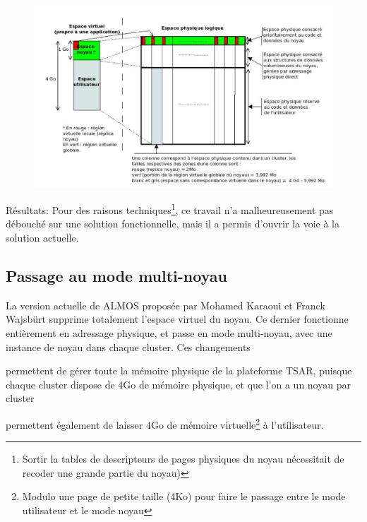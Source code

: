       \begin{figure}[!h]
        \centering \includegraphics[scale=0.17]{include/img/almos-guerret}
        \caption{}
        \label{almos-guerret}
      \end{figure}
      
      \begin{paragraph}{Résultats:}
        Pour des raisons techniques\footnote{Sortir la tables de descripteurs de
          pages physiques du noyau nécessitait de recoder une grande partie du
          noyau)}, ce travail n'a malheureusement pas débouché sur une solution
        fonctionnelle, mais il a permis d'ouvrir la voie à la solution actuelle.
      \end{paragraph}

      
  \subsection{Passage au mode multi-noyau}
      
    La version actuelle de ALMOS proposée par Mohamed Karaoui et Franck Wajsbürt
    supprime totalement l'espace virtuel du noyau. Ce dernier fonctionne
    entièrement en adressage physique, et passe en mode multi-noyau, avec une
    instance de noyau dans chaque cluster. Ces changements \benumline \item
    permettent de gérer toute la mémoire physique de la plateforme TSAR, puisque
    chaque cluster dispose de 4Go de mémoire physique, et que l'on a un noyau
    par cluster \item permettent également de laisser 4Go de mémoire
    virtuelle\footnote{Modulo une page de petite taille (4Ko) pour faire le
      passage entre le mode utilisateur et le mode noyau} à
    l'utilisateur\eenumline.


